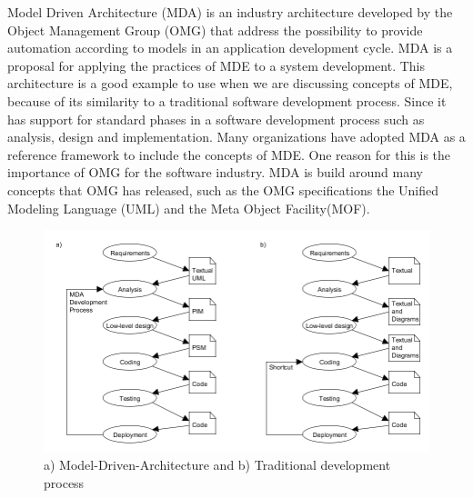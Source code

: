 Model Driven Architecture (MDA) is an industry architecture developed by the
Object Management Group (OMG) that address the possibility to provide automation
according to models in an application development cycle.
MDA is a proposal for applying the practices of MDE to a system development. This
architecture is a good example to use when we are discussing concepts of MDE,
because of its similarity to a traditional software development process. Since
it has support for standard phases in a software development process such as
analysis, design and implementation. Many organizations have adopted MDA as a
reference framework to include the concepts of MDE. One reason for this is the
importance of OMG for the software industry. MDA is build around many
concepts that OMG has released, such as the OMG specifications the Unified
Modeling Language (UML) and the Meta Object Facility(MOF).

\begin{figure}[H]
	\centering
	\includegraphics[scale=0.5]{./Figures/MDA.png}
	\caption[Software Development with MDA]
	{a) Model-Driven-Architecture and b) Traditional development process}
	\label{fig:MDA}
\end{figure}

